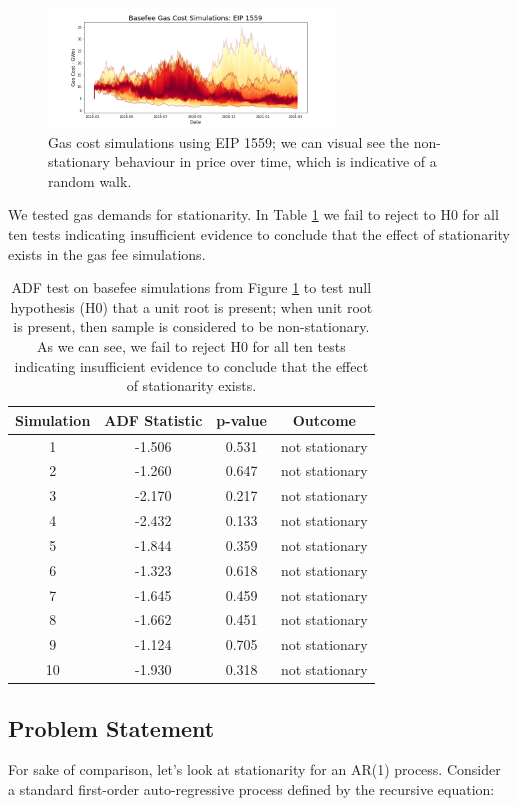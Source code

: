 \documentclass[peerreview]{ieeesyscoin}
\begin{document}
\begin{figure}[h!]
\includegraphics[width=3in]{img/basefee_simulations.png}
\caption{Gas cost simulations using EIP 1559; we can visual see the non-stationary behaviour in price over time, which is indicative of a random walk.}  
\label{fig:basefee_simulations}
\end{figure} 

We tested gas demands for stationarity. In Table \ref{fig:basefee_simulations} we fail to reject to H0 for all ten tests indicating insufficient evidence to conclude that the effect of stationarity exists in the gas fee simulations. 

\begin{table}[h!]
\centering
\begin{tabular}{ |c|c|c|c| } 
\hline
 Simulation & ADF Statistic & p-value & Outcome \\
\hline
1 & -1.506 & 0.531 & not stationary \\
2 & -1.260 & 0.647 & not stationary \\
3 & -2.170 & 0.217 & not stationary \\
4 & -2.432 & 0.133 & not stationary \\
5 & -1.844 & 0.359 & not stationary \\
6 & -1.323 & 0.618 & not stationary \\
7 & -1.645 & 0.459 & not stationary \\
8 & -1.662 & 0.451 & not stationary \\
9 & -1.124 & 0.705 & not stationary \\
10 & -1.930 & 0.318 & not stationary \\
\hline
\end{tabular}
\caption{ADF test on basefee simulations from Figure \ref{fig:basefee_simulations} to test null hypothesis (H0) that a unit root is present; when unit root is present, then sample is considered to be non-stationary. As we can see, we fail to reject H0 for all ten tests indicating insufficient evidence to conclude that the effect of stationarity exists.}
\label{table:pow_vs_pos}
\end{table}

\subsection{Problem Statement}
\label{section:problem_statement}
For sake of comparison, let's look at stationarity for an AR(1) process. Consider a standard first-order auto-regressive process defined by the recursive equation:
\end{document}

